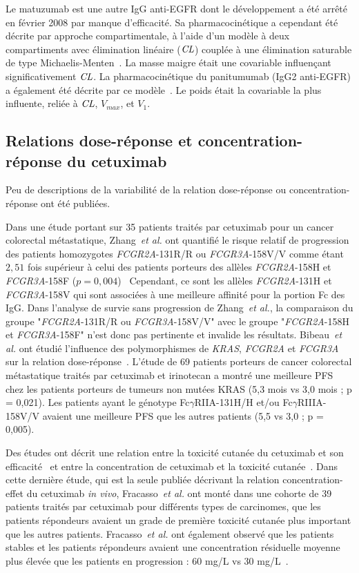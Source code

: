 Le matuzumab est une autre IgG anti-EGFR dont le développement a été arrêté en février 2008 par manque d'efficacité. Sa pharmacocinétique a cependant été décrite par approche compartimentale, à l'aide d'un modèle à deux compartiments avec élimination linéaire ($\operatorname{\textit{CL}}$) couplée à une élimination saturable de type Michaelis-Menten~\citep{REF72, REF129}. La masse maigre était une covariable influençant significativement $\operatorname{\textit{CL}}$. La pharmacocinétique du panitumumab (IgG2 anti-EGFR) a également été décrite par ce modèle~\citep{REF73}. Le poids était la covariable la plus influente, reliée à $\operatorname{\textit{CL}}$, $V_{max}$, et $V_1$.

\subsection{Relations dose-réponse et concentration-réponse du cetuximab}
Peu de descriptions de la variabilité de la relation dose-réponse ou concentration-réponse ont été publiées.

Dans une étude portant sur 35 patients traités par cetuximab pour un cancer colorectal métastatique, Zhang~\textit{et al.} ont quantifié le risque relatif de progression des patients homozygotes \textit{FCGR2A}-131R/R ou \textit{FCGR3A}-158V/V comme étant $2,51$ fois supérieur à celui des patients porteurs des allèles \textit{FCGR2A}-158H et \textit{FCGR3A}-158F ($p = 0,004$)~\citep{REF130} Cependant, ce sont les allèles \textit{FCGR2A}-131H et \textit{FCGR3A}-158V qui sont associées à une meilleure affinité pour la portion Fc des IgG. Dans l'analyse de survie sans progression de Zhang~\textit{et al.}, la comparaison du groupe "\textit{FCGR2A}-131R/R ou \textit{FCGR3A}-158V/V" avec le groupe "\textit{FCGR2A}-158H et \textit{FCGR3A}-158F" n'est donc pas pertinente et invalide les résultats. Bibeau~\textit{et al.} ont étudié l'influence des polymorphismes de \textit{KRAS}, \textit{FCGR2A} et \textit{FCGR3A} sur la relation dose-réponse~\citep{REF131}. L'étude de 69 patients porteurs de cancer colorectal métastatique traités par cetuximab et irinotecan a montré une meilleure PFS chez les patients porteurs de tumeurs non mutées KRAS (5,3 mois vs 3,0 mois ; p = 0,021). Les patients ayant le génotype Fc$\gamma$RIIA-131H/H et/ou Fc$\gamma$RIIIA-158V/V avaient une meilleure PFS que les autres patients (5,5 vs 3,0 ; p = 0,005).

Des études ont décrit une relation entre la toxicité cutanée du cetuximab et son efficacité~\citep{REF132} et entre la concentration de cetuximab et la toxicité cutanée~\citep{REF122}. Dans cette dernière étude, qui est la seule publiée décrivant la relation concentration-effet du cetuximab \textit{in vivo}, Fracasso~\textit{et al.} ont monté dans une cohorte de 39 patients traités par cetuximab pour différents types de carcinomes, que les patients répondeurs avaient un grade de première toxicité cutanée plus important que les autres patients. Fracasso~\textit{et al.} ont également observé que les patients stables et les patients répondeurs avaient une concentration résiduelle moyenne plus élevée que les patients en progression : 60 mg/L vs 30 mg/L~\citep{REF122}.
